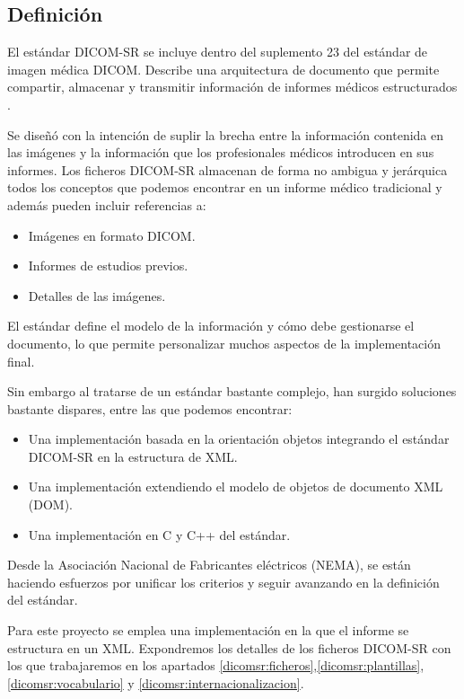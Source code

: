 \subsection{Definición}
El estándar DICOM-SR se incluye dentro del suplemento 23 del estándar de imagen médica DICOM. Describe una arquitectura de documento que permite compartir, almacenar y transmitir información de informes médicos estructurados \cite{hussein2004dicom}.\par
Se diseñó con la intención de suplir la brecha entre la información contenida en las imágenes y la información que los profesionales médicos introducen en sus informes. Los ficheros DICOM-SR almacenan de forma no ambigua y jerárquica todos los conceptos que podemos encontrar en un informe médico tradicional y además pueden incluir referencias a:
\begin{itemize}
	\item Imágenes en formato DICOM. 
	\item Informes de estudios previos.
	\item Detalles de las imágenes.
\end{itemize}\par\medskip\par
El estándar define el modelo de la información y cómo debe gestionarse el documento, lo que permite personalizar muchos aspectos de la implementación final\cite{hussein2004dicom2}.\par
Sin embargo al tratarse de un estándar bastante complejo, han surgido soluciones bastante dispares, entre las que podemos encontrar:
\begin{itemize}
	\item Una implementación basada en la orientación objetos integrando el estándar DICOM-SR en la estructura de XML.\cite{tirado2002information}
	\item Una implementación extendiendo el modelo de objetos de documento XML (DOM).\cite{doi:10.1117}
	\item Una implementación en C y C++ del estándar. \cite{Riesmeier2001795}
\end{itemize}
\par
Desde la Asociación Nacional de Fabricantes eléctricos (NEMA), se están haciendo esfuerzos por unificar los criterios y seguir avanzando en la definición del estándar.\par
Para este proyecto se emplea una implementación en la que el informe se estructura en un XML. Expondremos los detalles de los ficheros DICOM-SR con los que trabajaremos en los apartados \ref{dicomsr:ficheros},\ref{dicomsr:plantillas}, \ref{dicomsr:vocabulario} y \ref{dicomsr:internacionalizacion}.\par

